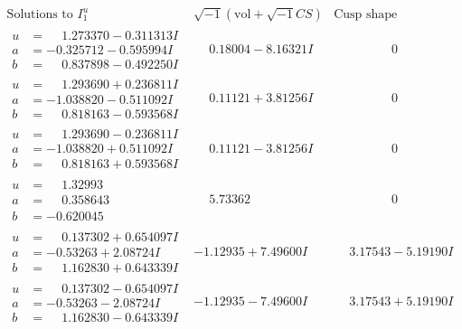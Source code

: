 \documentclass[1p]{elsarticle_modified}
\theoremstyle{definition}
\newcommand{\I}{\sqrt{-1}}
\begin{document}
$$\begin{array}{c|c|c}
\text{Solutions to }I^u_{1}& \I (\text{vol} + \sqrt{-1}CS) & \text{Cusp shape}\\
 \hline 
\begin{aligned}
u &= \phantom{-}1.273370 - 0.311313 I \\
a &= -0.325712 - 0.595994 I \\
b &= \phantom{-}0.837898 - 0.492250 I\end{aligned}
 & \phantom{-}0.18004 - 8.16321 I & \phantom{-0.000000 } 0 \\ \hline\begin{aligned}
u &= \phantom{-}1.293690 + 0.236811 I \\
a &= -1.038820 - 0.511092 I \\
b &= \phantom{-}0.818163 - 0.593568 I\end{aligned}
 & \phantom{-}0.11121 + 3.81256 I & \phantom{-0.000000 } 0 \\ \hline\begin{aligned}
u &= \phantom{-}1.293690 - 0.236811 I \\
a &= -1.038820 + 0.511092 I \\
b &= \phantom{-}0.818163 + 0.593568 I\end{aligned}
 & \phantom{-}0.11121 - 3.81256 I & \phantom{-0.000000 } 0 \\ \hline\begin{aligned}
u &= \phantom{-}1.32993\phantom{ +0.000000I} \\
a &= \phantom{-}0.358643\phantom{ +0.000000I} \\
b &= -0.620045\phantom{ +0.000000I}\end{aligned}
 & \phantom{-}5.73362\phantom{ +0.000000I} & \phantom{-0.000000 } 0 \\ \hline\begin{aligned}
u &= \phantom{-}0.137302 + 0.654097 I \\
a &= -0.53263 + 2.08724 I \\
b &= \phantom{-}1.162830 + 0.643339 I\end{aligned}
 & -1.12935 + 7.49600 I & \phantom{-}3.17543 - 5.19190 I \\ \hline\begin{aligned}
u &= \phantom{-}0.137302 - 0.654097 I \\
a &= -0.53263 - 2.08724 I \\
b &= \phantom{-}1.162830 - 0.643339 I\end{aligned}
 & -1.12935 - 7.49600 I & \phantom{-}3.17543 + 5.19190 I \\ \hline\begin{aligned}

\end{aligned}
\end{array}$$
\end{document}

